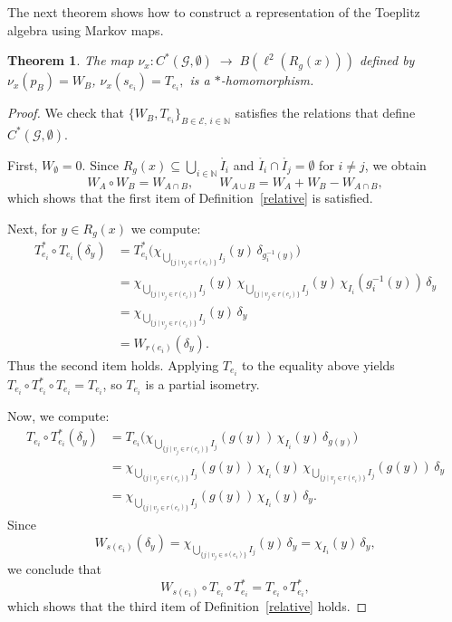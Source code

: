 \documentclass[12pt, reqno]{amsart}
\newtheorem{theorem}{Theorem}[section]
\theoremstyle{definition}
\theoremstyle{remark}
\numberwithin{equation}{section}
\begin{document}
The next theorem shows how to construct a representation of the Toeplitz algebra using Markov maps.

\begin{theorem}\label{basic}
    The map 
    $
    \nu_x: C^*(\mathcal{G}, \emptyset) \;\longrightarrow\; B(\ell^2(R_g(x)))
    $
    defined by
    $
    \nu_x(p_B) = W_B$, $ 
    \nu_x(s_{e_i}) = T_{e_i},
    $
    is a $*$-homomorphism.
\end{theorem}

 
\begin{proof}
We check that $\{W_B, T_{e_i}\}_{B \in \mathcal{E},\, i \in \mathbb{N}}$ 
satisfies the relations that define $C^*(\mathcal{G}, \emptyset)$.  

First, $W_{\emptyset} = 0$.  
Since $R_g(x) \subseteq \bigcup_{i \in \mathbb{N}} \mathring{I_i}$ and 
$\mathring{I_i} \cap \mathring{I_j} = \emptyset$ for $i \neq j$, 
we obtain
\[
W_A \circ W_B = W_{A \cap B},
\qquad 
W_{A \cup B} = W_A + W_B - W_{A \cap B},
\]
which shows that the first item of Definition~\ref{relative} is satisfied.  

Next, for $y \in R_g(x)$ we compute:
\begin{align*}
     T_{e_i}^* \circ T_{e_i}(\delta_y) 
     &= T_{e_i}^* \Big( \chi_{\bigcup_{\{j \mid v_j \in r(e_i)\}} I_j}(y)\, 
                         \delta_{g_i^{-1}(y)} \Big) \\
     &= \chi_{\bigcup_{\{j \mid v_j \in r(e_i)\}} I_j}(y)\,
        \chi_{\bigcup_{\{j \mid v_j \in r(e_i)\}} I_j}(y)\,
        \chi_{I_i}(g_i^{-1}(y))\, \delta_y \\
     &= \chi_{\bigcup_{\{j \mid v_j \in r(e_i)\}} I_j}(y)\,\delta_y \\
     &= W_{r(e_i)}(\delta_y).
\end{align*}
Thus the second item holds.  
Applying $T_{e_i}$ to the equality above yields 
$T_{e_i} \circ T_{e_i}^* \circ T_{e_i} = T_{e_i}$, 
so $T_{e_i}$ is a partial isometry.  

Now, we compute:
\begin{align*}
    T_{e_i} \circ T_{e_i}^*(\delta_y) 
    &= T_{e_i}\Big(
       \chi_{\bigcup_{\{j \mid v_j \in r(e_i)\}} I_j}(g(y))\,
       \chi_{I_i}(y)\,\delta_{g(y)}
       \Big) \\
    &= \chi_{\bigcup_{\{j \mid v_j \in r(e_i)\}} I_j}(g(y))\,
       \chi_{I_i}(y)\,
       \chi_{\bigcup_{\{j \mid v_j \in r(e_i)\}} I_j}(g(y))\,
       \delta_y \\
    &= \chi_{\bigcup_{\{j \mid v_j \in r(e_i)\}} I_j}(g(y))\,
       \chi_{I_i}(y)\,\delta_y.
\end{align*}
Since
\[
W_{s(e_i)}(\delta_y) 
   = \chi_{\bigcup_{\{j \mid v_j \in s(e_i)\}} I_j}(y)\,\delta_y
   = \chi_{I_i}(y)\,\delta_y,
\]
we conclude that 
\[
W_{s(e_i)} \circ T_{e_i} \circ T_{e_i}^* 
   = T_{e_i} \circ T_{e_i}^*,
\]
which shows that the third item of Definition~\ref{relative} holds.  


\end{proof}
\end{document}
